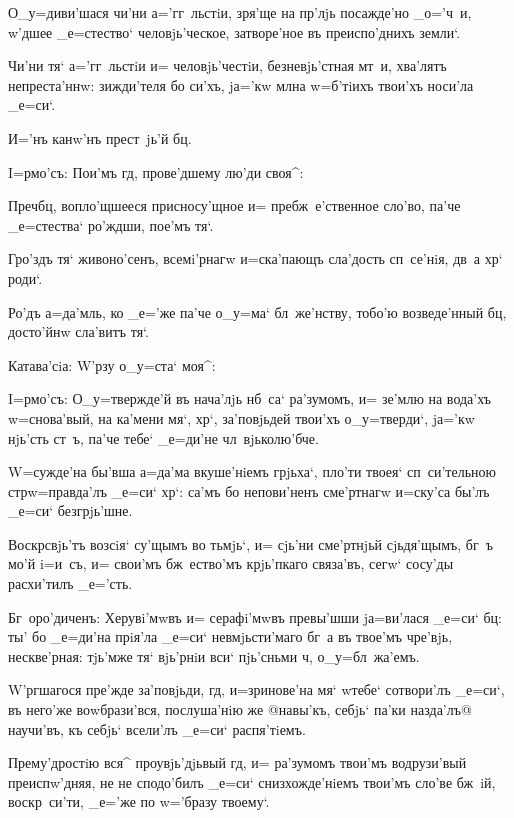 О_у=диви'шася чи'ни а='гг~льстiи, зря'ще на пр'лjь 
посажде'но _о='ч~и, w'дшее _е=стество` 
человjь'ческое, затворе'ное въ преиспо'днихъ земли`.

Чи'ни тя` а='гг~льстiи и= человjь'честiи, 
безневjь'стная мт~и, хва'лятъ непреста'ннw: зижди'теля бо 
си'хъ, jа='кw мл на w=б'тiихъ твои'хъ носи'ла 
_е=си`.

И='нъ канw'нъ прест~jь'й бц.

I=рмо'съ: Пои'мъ гд, прове'дшему лю'ди своя^:

Преч бц, вопло'щшееся присносу'щное и= 
пребж~е'ственное сло'во, па'че _е=стества` ро'ждши, 
пое'мъ тя`.

Гро'здъ тя` живоно'сенъ, всемi'рнагw и=ска'пающъ 
сла'дость сп~се'нiя, дв~а хр` роди`.

Ро'дъ а=да'мль, ко _е='же па'че о_у=ма` бл~же'нству, 
тобо'ю возведе'нный бц, досто'йнw сла'витъ тя`.

Катава'сiа: W'рзу о_у=ста` моя^:


I=рмо'съ: О_у=твержде'й въ нача'лjь нб~са` ра'зумомъ, 
и= зе'млю на вода'хъ w=снова'вый, на ка'мени мя`, 
хр`, за'повjьдей твои'хъ о_у=тверди`, jа='кw нjь'сть 
ст~ъ, па'че тебе` _е=ди'не чл~вjьколю'бче.

W=сужде'на бы'вша а=да'ма вкуше'нiемъ грjьха`, пло'ти 
твоея` сп~си'тельною стр w=правда'лъ _е=си` хр`: 
са'мъ бо непови'ненъ сме'ртнагw и=ску'са бы'лъ _е=си` 
безгрjь'шне.

Воскр свjь'тъ возсiя` су'щымъ во тьмjь`, и= 
сjь'ни сме'ртнjьй сjьдя'щымъ, бг~ъ мо'й i=и~съ, и= 
свои'мъ бж~ество'мъ крjь'пкаго связа'въ, сегw` сосу'ды 
расхи'тилъ _е='сть.

Бг~оро'диченъ: Херувi'мwвъ и= серафi'мwвъ превы'шши 
jа=ви'лася _е=си` бц: ты' бо _е=ди'на прiя'ла _е=си` 
невмjьсти'маго бг~а въ твое'мъ чре'вjь, нескве'рная: 
тjь'мже тя` вjь'рнiи вси` пjь'сньми ч, 
о_у=бл~жа'емъ.


W'ргшагося пре'жде за'повjьди, гд, и=зринове'на 
мя` w\т тебе` сотвори'лъ _е=си`, въ него'же воwбрази'вся, 
послуша'нiю же @навы'къ, себjь` па'ки назда'лъ@ 
{научи'въ, къ себjь` всели'лъ} _е=си` распя'тiемъ.

Прему'дростiю вся^ проувjь'дjьвый гд, и= ра'зумомъ 
твои'мъ водрузи'вый преиспw'дняя, не не сподо'билъ _е=си` 
снизхожде'нiемъ твои'мъ сло'ве бж~iй, воскр~си'ти, _е='же 
по w='бразу твоему`.

